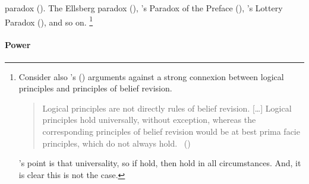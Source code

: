 \begin{note}
  \citeauthor{Allais:1979aa} paradox (\cite{Allais:1979aa}).
  The Ellsberg paradox (\cite{Ellsberg:1961aa}), \citeauthor{Makinson:1965aa}'s Paradox of the Preface (\citeyear{Makinson:1965aa}), \citeauthor{Kyburg:1997aa}'s Lottery Paradox (\citeyear{Kyburg:1997aa}), and so on.%
  \footnote{
    Consider also \citeauthor{Harman:1984aa}'s (\citeyear{Harman:1984aa,Harman:1986ux}) arguments against a strong connexion between logical principles and principles of belief revision.

  \begin{quote}
    Logical principles are not directly rules of belief revision.
    [\dots]
    Logical principles hold universally, without exception, whereas the corresponding principles of belief revision would be at best prima facie principles, which do not always hold.%
    \mbox{ }\hfill\mbox{(\citeyear[107--108]{Harman:1984aa})}
  \end{quote}

  \citeauthor{Harman:1984aa}'s point is that universality, so if hold, then hold in all circumstances.
  And, it is clear this is not the case.
  }
\end{note}

\paragraph*{Power}

